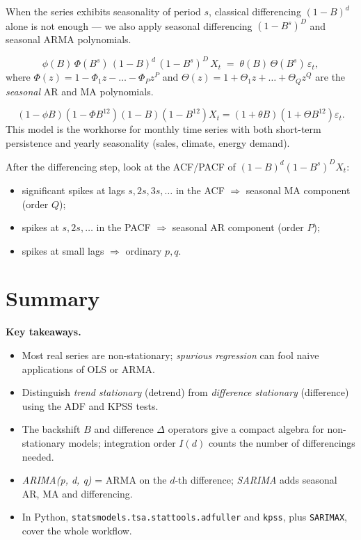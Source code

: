 When the series exhibits seasonality of period $s$, classical
differencing $(1 - B)^d$ alone is not enough — we also apply
seasonal differencing $(1 - B^s)^D$ and seasonal ARMA polynomials.

\begin{defbox}[SARIMA(p, d, q)(P, D, Q)$_s$]
\label{def:sarima}
\[
  \phi(B)\, \Phi(B^s)\,
  (1 - B)^d\, (1 - B^s)^D\, X_t
  \;=\;
  \theta(B)\, \Theta(B^s)\, \varepsilon_t,
\]
where $\Phi(z) = 1 - \Phi_1 z - \dots - \Phi_P z^P$ and
$\Theta(z) = 1 + \Theta_1 z + \dots + \Theta_Q z^Q$ are the
\emph{seasonal} AR and MA polynomials.
\end{defbox}

\begin{exbox}[SARIMA(1, 1, 1)(1, 1, 1)$_{12}$]
\[
  (1 - \phi B)(1 - \Phi B^{12})(1 - B)(1 - B^{12}) X_t
  = (1 + \theta B)(1 + \Theta B^{12}) \varepsilon_t.
\]
This model is the workhorse for monthly time series with both
short-term persistence and yearly seasonality (sales, climate, energy
demand).
\end{exbox}

\begin{rembox}[Identification]
After the differencing step, look at the ACF/PACF of
$(1 - B)^d (1 - B^s)^D X_t$:
\begin{itemize}
  \item significant spikes at lags $s, 2s, 3s, \dots$ in the ACF
        $\Rightarrow$ seasonal MA component (order $Q$);
  \item spikes at $s, 2s, \dots$ in the PACF $\Rightarrow$ seasonal
        AR component (order $P$);
  \item spikes at small lags $\Rightarrow$ ordinary $p, q$.
\end{itemize}
\end{rembox}

\section*{Summary}

\noindent\textbf{Key takeaways.}
\begin{itemize}
  \item Most real series are non-stationary; \emph{spurious
        regression} can fool naive applications of OLS or ARMA.
  \item Distinguish \emph{trend stationary} (detrend) from
        \emph{difference stationary} (difference) using the ADF and
        KPSS tests.
  \item The backshift $B$ and difference $\Delta$ operators give a
        compact algebra for non-stationary models; integration order
        $I(d)$ counts the number of differencings needed.
  \item \emph{ARIMA(p, d, q)} = ARMA on the $d$-th difference;
        \emph{SARIMA} adds seasonal AR, MA and differencing.
  \item In Python, \texttt{statsmodels.tsa.stattools.adfuller} and
        \texttt{kpss}, plus \texttt{SARIMAX}, cover the whole
        workflow.
\end{itemize}

